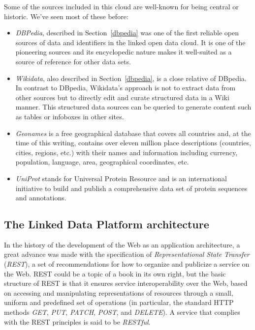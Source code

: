 Some of the sources included in this cloud are well-known for being
central or historic.  We've seen most of these before:

\begin{itemize}
\item
  \emph{DBPedia}, described in Section~\ref{dbpedia} was one of the first reliable open sources
  of data and identifiers in
  the linked open data cloud. It is one of the pioneering sources and
  its encyclopedic nature makes it well-suited as a source of reference
  for other data sets.

\item
  \emph{Wikidata}, also described in Section~\ref{dbpedia}, is a close relative of DBpedia.  In contrast to
  DBpedia, Wikidata's approach is not to extract data
  from other sources but to directly edit and curate structured data in
  a Wiki manner.  This structured data sources can be queried to
  generate content such as tables or infoboxes in other sites. 

\item
  \emph{Geonames} is a free geographical database that covers all countries
  and, at the time of this writing, contains over eleven million place
  descriptions (countries, cities, regions, etc.) with their names and
  information including currency, population, language, area,
  geographical coordinates, etc.

\item
  \emph{UniProt} stands for Universal Protein Resource and is an international
  initiative to build and publish a comprehensive data set of protein
  sequences and annotations.
\end{itemize}



\hypertarget{the-linked-data-platform-architecture}{%
\subsection{The Linked Data Platform
architecture}\label{the-linked-data-platform-architecture}}

In the history of the development of the Web as an application architecture,
a great advance was made with the specification of 
\emph{Representational State Transfer} (\emph{REST}), a set of recommendations 
for how to organize and publicize a service on the Web.  
REST could be a topic of a book in its own right, but the basic 
structure of REST is that it ensures service
interoperability over the Web, based on accessing and manipulating
representations of resources through a small, uniform and predefined set of
operations (in particular, the standard HTTP methods \emph{GET},
\emph{PUT}, \emph{PATCH}, \emph{POST}, and \emph{DELETE}). A service
that complies with the REST principles is said to be \emph{RESTful}.

